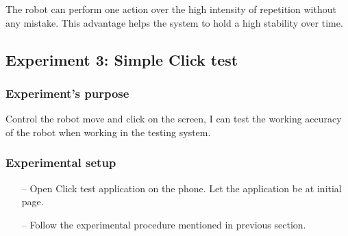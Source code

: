 The robot can perform one action over the high intensity of repetition without any mistake. This advantage helps the system to hold a high stability over time.

\subsection{Experiment 3: Simple Click test}
\subsubsection{Experiment's purpose}
Control the robot move and click on the screen, I can test the working accuracy of the robot when working in the testing system.
\subsubsection{Experimental setup}
\begin{itemize}
		\item[--]Open Click test application on the phone. Let the application be at initial page.
		\item[--]Follow the experimental procedure mentioned in previous section.
\end{itemize}
